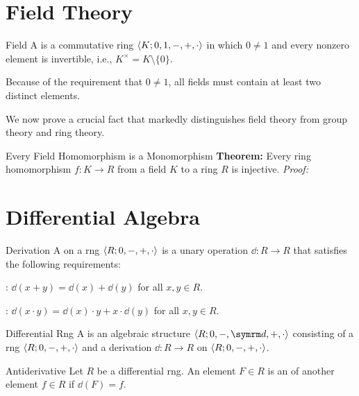 \documentclass[12pt]{report}
\begin{document}
\chapter{Field Theory}

\begin{dfnbox}{Field}
	A  is a commutative ring ${\langle {K; 0, 1, -, +, \cdot} \rangle}$ in which $0 \ne 1$ and every nonzero element is invertible, i.e., $K^\times = K \setminus \{0\}$.
\end{dfnbox}

Because of the requirement that $0 \ne 1$, all fields must contain at least two distinct elements.

We now prove a crucial fact that markedly distinguishes field theory from group theory and ring theory.

\begin{thmbox}{Every Field Homomorphism is a Monomorphism}
	\textbf{Theorem:} Every ring homomorphism $f: K \to R$ from a field $K$ to a ring $R$ is injective.
\tcblower
	\textit{Proof:}
\end{thmbox}



\chapter{Differential Algebra}

\begin{dfnbox}{Derivation}
	A  on a rng ${\langle {R; 0, -, +, \cdot} \rangle}$ is a unary operation $\dd: R \to R$ that satisfies the following requirements:
	\begin{dfnitems}
		\item {}: $\dd(x + y) = \dd(x) + \dd(y)$ for all $x, y \in R$.
		\item {}: $\dd(x \cdot y) = \dd(x) \cdot y + x \cdot \dd(y)$ for all $x, y \in R$.
	\end{dfnitems}
\end{dfnbox}

\begin{dfnbox}{Differential Rng}
	A  is an algebraic structure $\alg{R; 0, -, \dd, +, \cdot}$ consisting of a rng ${\langle {R; 0, -, +, \cdot} \rangle}$ and a derivation $\dd: R \to R$ on ${\langle {R; 0, -, +, \cdot} \rangle}$.
\end{dfnbox}

\begin{dfnbox}{Antiderivative}
	Let $R$ be a differential rng. An element $F \in R$ is an  of another element $f \in R$ if $\dd(F) = f$.
\end{dfnbox}
\end{document}
